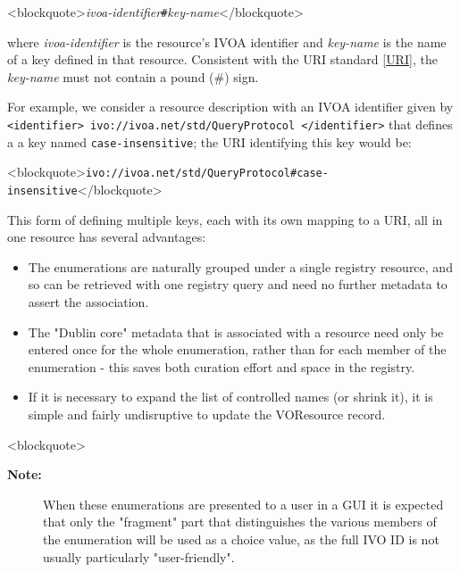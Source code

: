 \documentclass[11pt,a4paper]{ivoa}
\begin{document}
{{<blockquote>\emph{ivoa-identifier}\texttt{#}\emph{key-name}</blockquote>

where \emph{ivoa-identifier} is the resource's IVOA identifier and
\emph{key-name} is the name of a key defined in that resource.
Consistent with the URI standard [\href{#r:uri}{URI}], the
\emph{key-name} must not contain a pound (#) sign.



For example, we consider a resource description with an IVOA
identifier given by \texttt{<identifier>
ivo://ivoa.net/std/QueryProtocol </identifier>} that
defines a a key named \texttt{case-insensitive}; the URI
identifying this key would be: 


<blockquote>\texttt{ivo://ivoa.net/std/QueryProtocol#case-insensitive}</blockquote>



This form of defining multiple keys, each with its own mapping to a
URI, all in one resource has several advantages:



\begin{itemize}

\item  The enumerations are naturally grouped under a single registry
       resource, and so can be retrieved with one registry query and
       need no further metadata to assert the association. {}

\item  The "Dublin core" metadata that is associated with a resource
       need only be entered once for the whole enumeration, rather
       than for each member of the enumeration - this  saves both
       curation effort and space in the registry. {}

\item  If it is necessary to expand the list of controlled names (or
       shrink it), it is simple and fairly undisruptive to update the
       VOResource record.  {}

\end{itemize}

<blockquote>
\begin{table}
\begin{tabular}[FIXTHIS]

\begin{description}
\item[\textbf{Note:}] When these enumerations are presented to a user in a GUI it is
       expected that only the "fragment" part that distinguishes
       the various members of the enumeration will be used as a choice
       value, as the full IVO ID is not usually particularly
       "user-friendly". 


\end{description}
\end{tabular}
\end{table}}}
\end{document}
